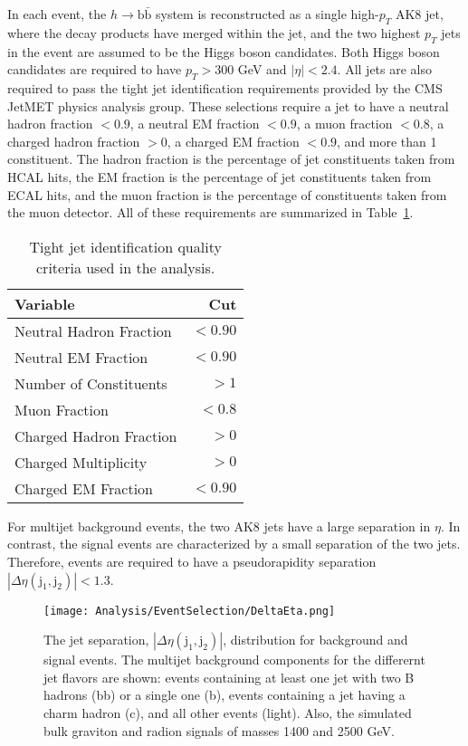 In each event, the $h\rightarrow \mathrm{b\bar{b}}$ system is reconstructed as a single high-$p_{T}$ AK8 jet, where the decay products have merged within the jet, and the two highest $p_{T}$ jets in the event are assumed to be the Higgs boson candidates. Both Higgs boson candidates are required to have $p_{T} > 300$ GeV and $|\eta| < 2.4$. All jets are also required to pass the tight jet identification requirements provided by the CMS JetMET physics analysis group. These selections require a jet to have a neutral hadron fraction $< 0.9$, a neutral EM fraction $< 0.9$, a muon fraction $< 0.8$, a charged hadron fraction $> 0$, a charged EM fraction $< 0.9$, and more than 1 constituent. The hadron fraction is the percentage of jet constituents taken from HCAL hits, the EM fraction is the percentage of jet constituents taken from ECAL hits, and the muon fraction is the percentage of constituents taken from the muon detector. All of these requirements are summarized in Table~\ref{tab:tightjetid}.

\begin{table}[htb]
  \begin{center}
    \begin{tabular}{l r}
    \hline
    \hline
    Variable &  Cut \\
    \hline
    Neutral Hadron Fraction & $<0.90$  \\
    Neutral EM Fraction     & $<0.90$  \\
    Number of Constituents  & $>1$     \\
    Muon Fraction           & $<0.8$   \\
    Charged Hadron Fraction & $>0$     \\
    Charged Multiplicity    & $>0$     \\
    Charged EM Fraction     & $< 0.90$ \\
    \hline
    \hline
    \end{tabular}
   \caption{Tight jet identification quality criteria used in the analysis.\label{tab:tightjetid}}
  \end{center}
\end{table}

For multijet background events, the two AK8 jets have a large separation in $\eta$. In contrast, the signal events are characterized by a small separation of the two jets. Therefore, events are required to have a pseudorapidity separation $|\Delta\eta(\mathrm{j}_{1}, \mathrm{j}_{2})| < 1.3$. 

\begin{figure}[htbp]
\begin{center}
\texttt{[image: Analysis/EventSelection/DeltaEta.png]}
\end{center}
\caption{The jet separation, $|\Delta\eta(\mathrm{j}_{1}, \mathrm{j}_{2})|$, distribution for background and signal events. The multijet background components for the differernt jet flavors are shown: events containing at least one jet with two B hadrons (bb) or a single one (b), events containing a jet having a charm hadron (c), and all other events (light). Also, the simulated bulk graviton and radion signals of masses 1400 and 2500 GeV.}
\label{fig:DeltaEta}
\end{figure}

